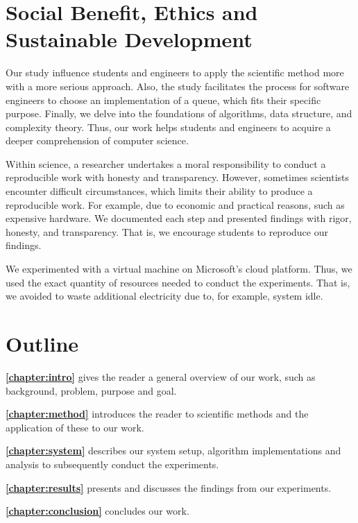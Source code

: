 \documentclass[a4paper,11pt]{kth-mag}
\newcommand*{\skippara}{\par\vspace{\baselineskip} \noindent}
\begin{document}
\section{Social Benefit, Ethics and Sustainable Development}
Our study influence students and engineers to apply the scientific method more with a more serious approach.
Also, the study facilitates the process for software engineers to choose an implementation of a queue, which fits their specific purpose.
Finally, we delve into the foundations of algorithms, data structure, and complexity theory.
Thus, our work helps students and engineers to acquire a deeper comprehension of computer science.

\skippara Within science, a researcher undertakes a moral responsibility to conduct a reproducible work with honesty and transparency.
However, sometimes scientists encounter difficult circumstances, which limits their ability to produce a reproducible work.
For example, due to economic and practical reasons, such as expensive hardware.
We documented each step and presented findings with rigor, honesty, and transparency.
That is, we encourage students to reproduce our findings.

\skippara We experimented with a virtual machine on Microsoft's cloud platform.
Thus, we used the exact quantity of resources needed to conduct the experiments.
That is, we avoided to waste additional electricity due to, for example, system idle.



\section{Outline}

\textbf{\cref{chapter:intro}} gives the reader a general overview of our work, such as background, problem, purpose and goal.

\skippara \textbf{\cref{chapter:method}} introduces the reader to scientific methods and the application of these to our work.
\skippara \textbf{\cref{chapter:system}} describes our system setup, algorithm implementations and analysis to subsequently conduct the experiments.
\skippara \textbf{\cref{chapter:results}} presents and discusses the findings from our experiments.
\skippara \textbf{\cref{chapter:conclusion}} concludes our work.
\end{document}
